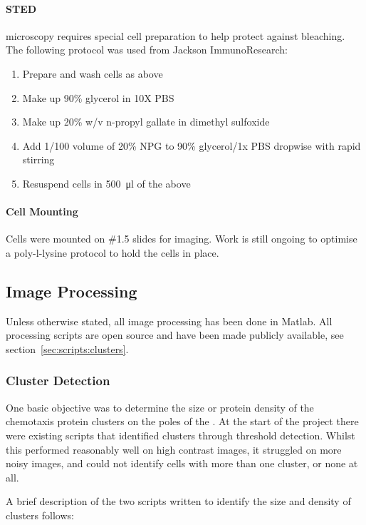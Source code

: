 \documentclass[../main.tex]{subfiles}
\begin{document}
\paragraph{STED} microscopy requires special cell preparation to help protect against bleaching. The following protocol was used from Jackson ImmunoResearch:

\begin{enumerate}
\item Prepare and wash cells as above
\item Make up 90\% glycerol in 10X PBS
\item Make up 20\% w/v n-propyl gallate in dimethyl sulfoxide
\item Add 1/100 volume of 20\% NPG to 90\% glycerol/1x PBS dropwise with rapid stirring
\item Resuspend cells in \SI{500}{\micro\litre} of the above
\end{enumerate}

\paragraph{Cell Mounting} Cells were mounted on \#1.5 slides for imaging. Work is still ongoing to optimise a poly-l-lysine protocol to hold the cells in place.

\subsection{Image Processing}
\label{sec:methods:imageprocessing}
Unless otherwise stated, all image processing has been done in Matlab. All processing scripts are open source and have been made publicly available, see section~\ref{sec:scripts:clusters}.

\subsubsection{Cluster Detection}
One basic objective was to determine the size or protein density of the chemotaxis protein clusters on the poles of the \ecoli. At the start of the project there were existing scripts that identified clusters through threshold detection. Whilst this performed reasonably well on high contrast images, it struggled on more noisy images, and could not identify cells with more than one cluster, or none at all.

A brief description of the two scripts written to identify the size and density of clusters follows:
\end{document}
